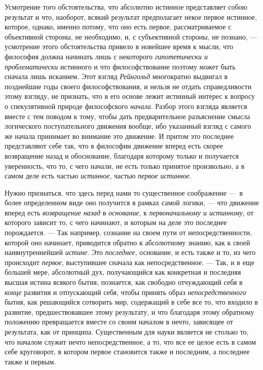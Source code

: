 Усмотрение того обстоятельства, что абсолютно истинное представляет собою
результат и что, наоборот, всякий результат предполагает некое первое
истинное, которое, однако, именно потому, что оно есть первое,
рассматриваемое с объективной стороны, не необходимо, и, с субъективной
стороны, не познано, — усмотрение этого обстоятельства привело в новейшее
время к мысли, что философия должна начинать лишь с некоторого
{\em гипотетически и проблематически} истинного и что
философствование поэтому может быть сначала лишь исканием. Этот взгляд
{\em Рейнгольд} многократно выдвигал в позднейшие годы
своего философствования, и нельзя не отдать справедливости этому взгляду,
не признать, что в его основе лежит истинный интерес к вопросу о
спекулятивной природе философского {\em начала}. Разбор
этого взгляда является вместе с тем поводом к тому, чтобы дать
предварительное разъяснение смысла логического поступательного движения
вообще, ибо указанный взгляд с самого же начала принимает во внимание это
движение. И притом это последнее представляют себе так, что в философии
движение вперед есть скорее возвращение назад и обоснование, благодаря
которому только и получается уверенность, что то, с чего начали, не есть
только принятое произвольно, а в самом деле есть частью
{\em истинное}, частью {\em первое
истинное}.

Нужно признаться, что здесь перед нами то существенное соображение —~в более
определенном виде оно получится в рамках самой логики, — что движение
вперед есть {\em возвращение назад} в
{\em основание}, к
{\em первоначальному и истинному}, от которого зависит
то, с чего начинают, и которым на деле это последнее порождается. — Так
например, сознание на своем пути от непосредственности, которой оно
начинает, приводится обратно к абсолютному знанию, как к своей
наивнутреннейшей {\em истине}. Это
{\em последнее}, основание, и есть также и то, из чего
происходит {\em первое}, выступившее сначала как
непосредственное. — Так, и в еще большей мере, абсолютный дух, получающийся
как конкретная и последняя высшая истина всякого бытия, познается, как
свободно отчуждающий себя в {\em конце} развития и
отпускающий себя, чтобы принять образ
{\em непосредственного} бытия, как решающийся сотворить
мир, содержащий в себе все то, что входило в развитие, предшествовавшее
этому результату, и что благодаря этому обратному положению превращается
вместе со своим началом в нечто, зависящее от результата, как от принципа.
Существенным для науки является не столько то, что началом служит нечто
непосредственное, а то, что все ее целое есть в самом себе круговорот, в
котором первое становится также и последним, а последнее также и первым.

